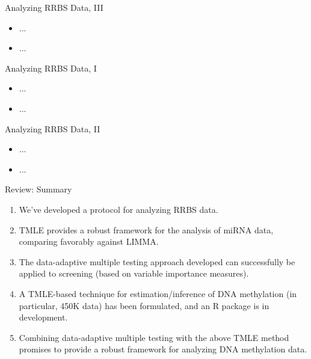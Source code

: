 \documentclass[12pt,t,handout]{beamer}
\begin{document}
\begin{frame}[c]{Analyzing RRBS Data, III}

\begin{center}
\begin{itemize}
	\item ...
    \item ...
\end{itemize}
\end{center}

\note{}

\end{frame}


\begin{frame}[c]{Analyzing RRBS Data, I}

\begin{center}
\begin{itemize}
	\item ...
    \item ...
\end{itemize}
\end{center}

\note{}

\end{frame}


\begin{frame}[c]{Analyzing RRBS Data, II}

\begin{center}
\begin{itemize}
	\item ...
  \item ...
\end{itemize}
\end{center}

\note{}

\end{frame}


\begin{frame}[c]{Review: Summary}

  \begin{enumerate}
  	\itemsep12pt
  	\item We've developed a protocol for analyzing RRBS data.
  	\item TMLE provides a robust framework for the analysis of
          miRNA data, comparing favorably against LIMMA.
  	\item The data-adaptive multiple testing approach developed
          can successfully be applied to screening (based on
          variable importance measures).
  	\item A TMLE-based technique for estimation/inference of DNA
          methylation (in particular, 450K data) has been
          formulated, and an R package is in development.
  	\item Combining data-adaptive multiple testing with the above
    	  TMLE method promises to provide a robust framework for
          analyzing DNA methylation data.
  \end{enumerate}


\end{frame}
\end{document}
